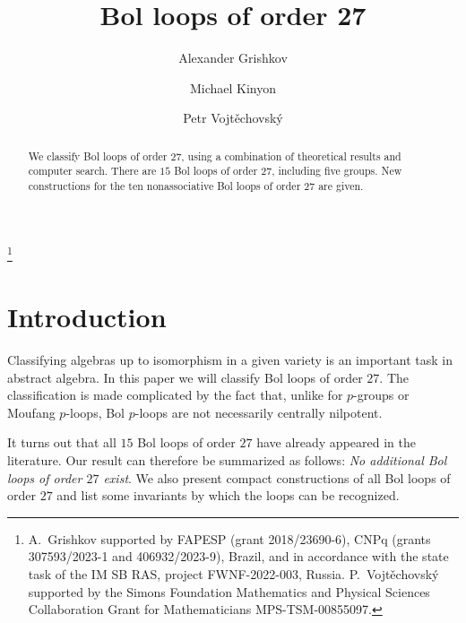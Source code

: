 \documentclass[12pt,reqno]{amsart}
\numberwithin{equation}{section}
\theoremstyle{plain}
\theoremstyle{definition}
\begin{document}
\title{Bol loops of order 27}

\author{Alexander Grishkov}
\author{Michael Kinyon}
\author{Petr Vojt\v echovsk\'y}

\address[Kinyon,Vojt\v{e}chovsk\'y]{Department of Mathematics\\ University of Denver\\ 2390 S.~York St.\\ Denver, CO 80208, USA}
\address[Grishkov]{Institute of Mathematics and Statistics, University of S\~ao Paulo, Brazil and Sobolev Institute of Mathematics, Omsk, Russia}


\thanks{A.~Grishkov supported by FAPESP (grant 2018/23690-6), CNPq (grants 307593/2023-1 and 406932/2023-9), Brazil, and in accordance with the state task of the IM SB RAS, project FWNF-2022-003, Russia. P.~Vojt\v{e}chovsk\'y supported by the Simons Foundation Mathematics and Physical Sciences Collaboration Grant for Mathematicians MPS-TSM-00855097.}



\begin{abstract}
We classify Bol loops of order $27$, using a combination of theoretical results and computer search. There are $15$ Bol loops of order $27$, including five groups. New constructions for the ten nonassociative Bol loops of order $27$ are given.
\end{abstract}

\maketitle

\section{Introduction}

Classifying algebras up to isomorphism in a given variety is an important task in abstract algebra. In this paper we will classify Bol loops of order $27$. The classification is made complicated by the fact that, unlike for $p$-groups or Moufang $p$-loops, Bol $p$-loops are not necessarily centrally nilpotent.

It turns out that all $15$ Bol loops of order $27$ have already appeared in the literature. Our result can therefore be summarized as follows: \emph{No additional Bol loops of order $27$ exist}. We also present compact constructions of all Bol loops of order $27$ and list some invariants by which the loops can be recognized.
\end{document}
